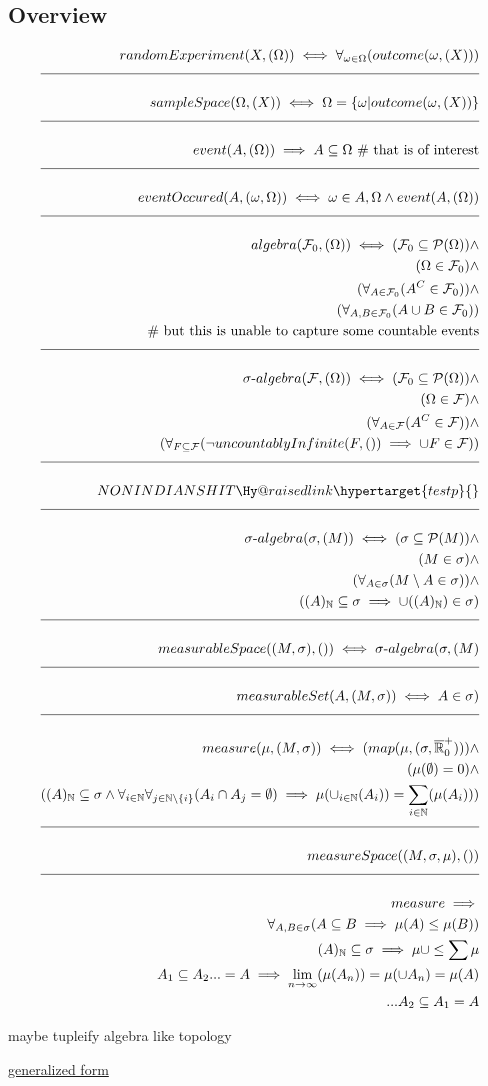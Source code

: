 \documentclass[a4paper]{article}
\makeatletter
\newcommand{\eqComment}[1]{\text{  \# #1}}
\newcommand{\n}{\\[1.5ex] \hline \nonumber \\[0ex]}
\newcommand{\m}{\nonumber \\}
\newcommand{\labeltarget}[1]{\Hy@raisedlink{\hypertarget{#1}{}}}
\makeatother
\begin{document}
\subsection{Overview}
\begin{tcolorbox}
\begin{align}
   randomExperiment(X, (\Omega)) \iff \forall_{\omega \in \Omega} (outcome(\omega, (X)))
\n sampleSpace(\Omega, (X)) \iff \Omega = \{\omega | outcome(\omega, (X))\}
\n event(A, (\Omega)) \implies A \subseteq \Omega \eqComment{that is of interest}
\n eventOccured(A, (\omega, \Omega)) \iff \omega \in A, \Omega \land event(A, (\Omega))
\n algebra(\mathcal{F}_0, (\Omega)) \iff (\mathcal{F}_0 \subseteq \mathcal{P}(\Omega)) \land
\m (\Omega \in \mathcal{F}_0) \land
\m (\forall_{A \in \mathcal{F}_0} (A^C \in \mathcal{F}_0)) \land
\m (\forall_{A, B \in \mathcal{F}_0} (A \cup B \in \mathcal{F}_0))
\m \eqComment{but this is unable to capture some countable events}
\n \sigma \text{-} algebra(\mathcal{F}, (\Omega)) \iff (\mathcal{F}_0 \subseteq \mathcal{P}(\Omega)) \land
\m (\Omega \in \mathcal{F}) \land
\m (\forall_{A \in \mathcal{F}} (A^C \in \mathcal{F})) \land
\m (\forall_{F \subseteq \mathcal{F}} (\lnot uncountablyInfinite(F, ()) \implies \cup F \in \mathcal{F}))
\n NONINDIANSHIT \labeltarget{testp}
\n \sigma\text{-}algebra(\sigma, (M)) \iff (\sigma \subseteq \mathcal{P}(M)) \land
\m (M \in \sigma) \land
\m (\forall_{A \in \sigma} (M \setminus A \in \sigma)) \land
\m ((A)_\mathbb{N} \subseteq \sigma \implies \cup ((A)_\mathbb{N}) \in \sigma)
\n measurableSpace((M, \sigma), ()) \iff \sigma\text{-}algebra(\sigma, (M)
\n measurableSet(A, (M, \sigma)) \iff A \in \sigma)
\n measure(\mu, (M, \sigma)) \iff (map(\mu, (\sigma, \overline{\mathbb{R}}^+_0))) \land
\m (\mu(\emptyset) = 0) \land
\m ((A)_\mathbb{N} \subseteq \sigma \land \forall_{i \in \mathbb{N}} \forall_{j \in \mathbb{N} \setminus \{i\}} (A_i \cap A_j = \emptyset) \implies \mu(\cup_{i \in \mathbb{N}} (A_i)) = \sum_{i \in \mathbb{N}} (\mu(A_i)))
\n measureSpace((M, \sigma, \mu), ())
\n measure \implies
\m \forall_{A, B \in \sigma} (A \subseteq B \implies \mu(A) \leq \mu(B))
\m  (A)_\mathbb{N} \subseteq \sigma \implies \mu \cup \leq \sum \mu
\m A_1 \subseteq A_2 ... = A \implies \lim_{n \to \infty} (\mu(A_n)) = \mu(\cup A_n) = \mu(A)
\m ... A_2 \subseteq A_1 = A
\end {align}
\end{tcolorbox}
maybe tupleify algebra like topology

\hyperlink{testp}{generalized form}
\end{document}
